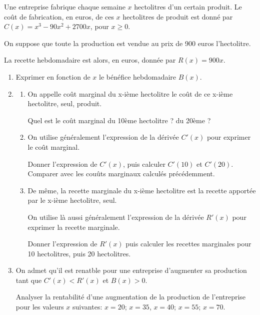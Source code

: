 \documentclass[10pt,a4paper,openany,twoside, eleve]{book}
\begin{document}
\begin{exon}
  Une entreprise fabrique chaque semaine $x$ hectolitres d'un certain produit.
  Le co\^ut de fabrication, en euros, de ces $x$ hectolitres de produit est donné
  par
  $C(x)=x^3-90x^2+2700x$, pour $x\geqslant0$.

  On suppose que toute la production est vendue
  au prix de 900 euros l'hectolitre.

  La recette hebdomadaire est alors, en euros,
  donnée par $R(x)=900x$.

  \begin{enumerate}
    \item Exprimer en fonction de $x$ le bénéfice hebdomadaire $B(x)$.
    \item
          \begin{enumerate}[label=\alph*]
            \item On appelle co\^ut marginal du x-ième hectolitre
                  le co\^ut de ce x-ième hectolitre, seul, produit.

                  Quel est le co\^ut marginal du 10ème hectolitre ? du 20ème ?


            \item
                  On utilise généralement l'expression de la dérivée $C'(x)$
                  pour exprimer le co\^ut marginal.

                  Donner l'expression de $C'(x)$,
                  puis calculer $C'(10)$ et $C'(20)$.
                  Comparer avec les cou\^uts marginaux calculés précédemment.

            \item De m\^eme, la recette marginale du x-ième hectolitre
                  est la recette apportée par le x-ième hectolitre, seul.

                  On utilise là aussi généralement l'expression de la dérivée $R'(x)$
                  pour exprimer la recette marginale.

                  Donner l'expression de $R'(x)$ puis calculer les recettes marginales
                  pour 10 hectolitres, puis 20 hectolitres.
          \end{enumerate}

    \item On admet qu'il est renatble pour une entreprise d'augmenter
          sa production tant que $C'(x)<R'(x)$ et $B(x)>0$.

          Analyser la rentabilité d'une augmentation de la production de l'entreprise
          pour les valeurs $x$ suivantes:
          $x=20$; $x=35$, $x=40$; $x=55$; $x=70$.
  \end{enumerate}

  \vspace{5mm}
  \noindent{}
\end{exon}
\end{document}
